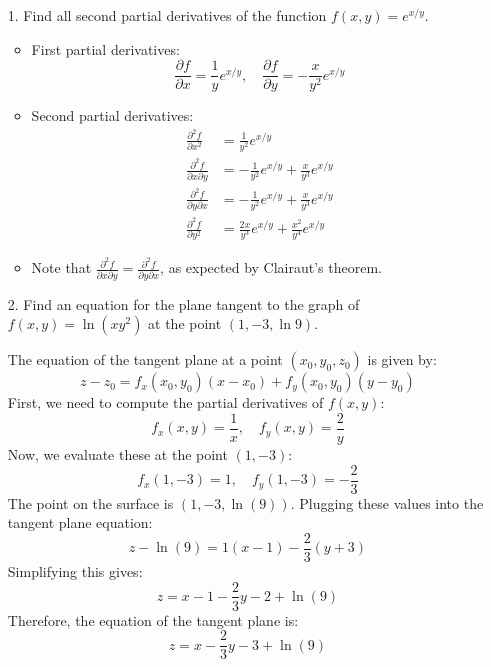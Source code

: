 \documentclass[reqno, 12pt]{amsart}
\begin{document}
\newpage
\begin{itemize}
  \item[1.] Find all second partial derivatives of the function $\displaystyle f(x,y) = e^{x/y}$.
    \newline

    \begin{answerbox}
      \begin{itemize}
        \item First partial derivatives:
          \[
            \frac{\partial f}{\partial x} = \frac{1}{y}e^{x/y}, \quad \frac{\partial f}{\partial y} = -\frac{x}{y^2}e^{x/y}
          \]
        \item Second partial derivatives:
          \begin{align*}
            \frac{\partial^2 f}{\partial x^2} &= \frac{1}{y^2}e^{x/y} \\
            \frac{\partial^2 f}{\partial x \partial y} &= -\frac{1}{y^2}e^{x/y} + \frac{x}{y^3}e^{x/y} \\
            \frac{\partial^2 f}{\partial y \partial x} &= -\frac{1}{y^2}e^{x/y} + \frac{x}{y^3}e^{x/y} \\
            \frac{\partial^2 f}{\partial y^2} &= \frac{2x}{y^3}e^{x/y} + \frac{x^2}{y^4}e^{x/y}
          \end{align*}
        \item Note that $\frac{\partial^2 f}{\partial x \partial y} = \frac{\partial^2 f}{\partial y \partial x}$, as expected by Clairaut's theorem.
      \end{itemize}
    \end{answerbox}
    \vspace{0.5 in}

  \item[2.] Find an equation for the plane tangent to the graph of $\displaystyle f(x,y) = \ln(xy^2)$ at the point $(1,-3,\ln9)$.
    \newline

    \begin{answerbox}
      The equation of the tangent plane at a point $(x_0, y_0, z_0)$ is given by:
      \[
        z - z_0 = f_x(x_0, y_0)(x - x_0) + f_y(x_0, y_0)(y - y_0)
      \]
      First, we need to compute the partial derivatives of $f(x,y)$:
      \[
        f_x(x,y) = \frac{1}{x}, \quad f_y(x,y) = \frac{2}{y}
      \]
      Now, we evaluate these at the point $(1,-3)$:
      \[
        f_x(1,-3) = 1, \quad f_y(1,-3) = -\frac{2}{3}
      \]
      The point on the surface is $(1, -3, \ln(9))$. Plugging these values into the tangent plane equation:
      \[
        z - \ln(9) = 1(x - 1) - \frac{2}{3}(y + 3)
      \]
      Simplifying this gives:
      \[
        z = x - 1 - \frac{2}{3}y - 2 + \ln(9)
      \]
      Therefore, the equation of the tangent plane is:
      \[
        z = x - \frac{2}{3}y - 3 + \ln(9)
      \]
    \end{answerbox}


\end{itemize}
\end{document}
